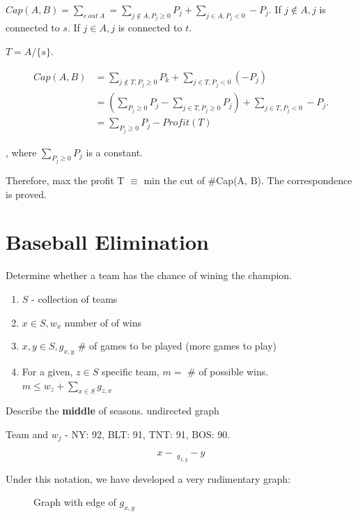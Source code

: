 \documentclass[a4paper]{report}
\theoremstyle{definition}
\begin{document}
$Cap(A, B)=\sum_{e~out~A} = \sum_{j \notin A, P_j\geq 0}P_j+\sum_{j \in A, P_j<0}-P_j$. If $j \notin A, j$ is connected to $s$. If $j \in A, j$ is connected to $t$.

$T=A/\{s\}$.

\begin{align*}
Cap(A, B)&=\sum_{j\notin T, P_j\geq 0}P_k+\sum_{j\in T, P_j <0}(-P_j) \\
&= (\sum_{P_j\geq 0}P_j-\sum_{j \in T, P_j\geq 0}P_j)+\sum_{j\in T, P_j <0}-P_j.\\
&=  \sum_{P_j\geq 0}P_j - Profit(T)
\end{align*}

, where $\sum_{P_j\geq 0}P_j$ is a constant.

Therefore, max the profit T $\equiv$ min the cut of #Cap(A, B). The correspondence is proved.


\section{Baseball Elimination}
Determine whether a team has the chance of wining the champion.
\begin{enumerate}
\item $S$ - collection of teams
\item $x\in S, w_x$ number of of wins
\item $x, y \in S, g_{x, y}$  \# of games to be played (more games to play)
\item For a given, $z\in S$ specific team, $m=$ \# of possible wins. $m \leq w_z+\sum_{x\in S} g_{z,x}$
\end{enumerate}

Describe the \textbf{middle} of seasons. undirected graph

Team and $w_j$ - NY: 92, BLT: 91, TNT: 91, BOS: 90.

$$x -\ _{g_{x, y}} - y$$


Under this notation, we have developed a very rudimentary graph:
\begin{figure}[!htp]
\centering
{}
\caption{Graph with edge of $g_{x,y}$}
\label{fig:baseball0}
\end{figure}
\end{document}
